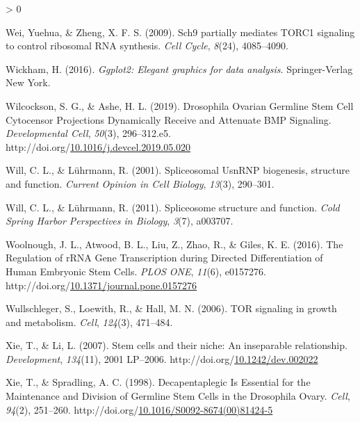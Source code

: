 \documentclass[12pt,oneside]{reedthesis}
\newlength{\cslhangindent}
\newenvironment{CSLReferences}[2] %
 {%
  \setlength{\parindent}{0pt}
  \ifodd #1 \everypar{\setlength{\hangindent}{\cslhangindent}}\ignorespaces\fi
  \ifnum #2 > 0
  \setlength{\parskip}{#2\baselineskip}
  \fi
 }%
 {}
\begin{document}
\begin{CSLReferences}{1}{0}
\leavevmode\hypertarget{ref-Wei2009a}{}%
Wei, Yuehua, \& Zheng, X. F. S. (2009). Sch9 partially mediates {TORC1} signaling to control ribosomal {RNA} synthesis. \emph{Cell Cycle}, \emph{8}(24), 4085--4090.

\leavevmode\hypertarget{ref-wickhamGgplot2ElegantGraphics2016}{}%
Wickham, H. (2016). \emph{Ggplot2: {Elegant} graphics for data analysis}. {Springer-Verlag New York}.

\leavevmode\hypertarget{ref-wilcocksonDrosophilaOvarianGermline2019}{}%
Wilcockson, S. G., \& Ashe, H. L. (2019). Drosophila {Ovarian Germline Stem Cell Cytocensor Projections Dynamically Receive} and {Attenuate BMP Signaling}. \emph{Developmental Cell}, \emph{50}(3), 296--312.e5. http://doi.org/\href{https://doi.org/10.1016/j.devcel.2019.05.020}{10.1016/j.devcel.2019.05.020}

\leavevmode\hypertarget{ref-Will2001}{}%
Will, C. L., \& Lührmann, R. (2001). Spliceosomal {UsnRNP} biogenesis, structure and function. \emph{Current Opinion in Cell Biology}, \emph{13}(3), 290--301.

\leavevmode\hypertarget{ref-Will2011d}{}%
Will, C. L., \& Lührmann, R. (2011). Spliceosome structure and function. \emph{Cold Spring Harbor Perspectives in Biology}, \emph{3}(7), a003707.

\leavevmode\hypertarget{ref-woolnoughRegulationRRNAGene2016}{}%
Woolnough, J. L., Atwood, B. L., Liu, Z., Zhao, R., \& Giles, K. E. (2016). The {Regulation} of {rRNA Gene Transcription} during {Directed Differentiation} of {Human Embryonic Stem Cells}. \emph{PLOS ONE}, \emph{11}(6), e0157276. http://doi.org/\href{https://doi.org/10.1371/journal.pone.0157276}{10.1371/journal.pone.0157276}

\leavevmode\hypertarget{ref-Wullschleger2006b}{}%
Wullschleger, S., Loewith, R., \& Hall, M. N. (2006). {TOR} signaling in growth and metabolism. \emph{Cell}, \emph{124}(3), 471--484.

\leavevmode\hypertarget{ref-Xie2007a}{}%
Xie, T., \& Li, L. (2007). Stem cells and their niche: An inseparable relationship. \emph{Development}, \emph{134}(11), 2001 LP--2006. http://doi.org/\href{https://doi.org/10.1242/dev.002022}{10.1242/dev.002022}

\leavevmode\hypertarget{ref-Xie1998d}{}%
Xie, T., \& Spradling, A. C. (1998). Decapentaplegic {Is Essential} for the {Maintenance} and {Division} of {Germline Stem Cells} in the {Drosophila Ovary}. \emph{Cell}, \emph{94}(2), 251--260. http://doi.org/\href{https://doi.org/10.1016/S0092-8674(00)81424-5}{10.1016/S0092-8674(00)81424-5}


\end{CSLReferences}
\end{document}
